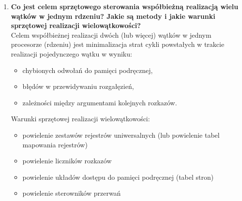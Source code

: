 \begin{enumerate}
			\item \textbf{Co jest celem sprzętowego sterowania współbieżną realizacją wielu wątków w jednym rdzeniu? Jakie są metody i jakie warunki sprzętowej realizacji wielowątkowości?}\\
			Celem współbieżnej realizacji dwóch (lub więcej) wątków w jednym procesorze (rdzeniu) jest 
			minimalizacja strat cykli powstałych w trakcie realizacji pojedynczego wątku w wyniku:
			\begin{itemize}
				\item chybionych odwołań do pamięci podręcznej, 
				\item błędów w przewidywaniu rozgałęzień, 
				\item zależności między argumentami kolejnych rozkazów.
			\end{itemize}
			Warunki sprzętowej realizacji wielowątkowości:
			\begin{itemize}
				\item powielenie zestawów rejestrów uniwersalnych (lub powielenie tabel mapowania rejestrów)
				\item powielenie liczników rozkazów
				\item powielenie układów dostępu do pamięci podręcznej (tabel stron)
				\item powielenie sterowników przerwań 
			\end{itemize}
		\end{enumerate}
		
